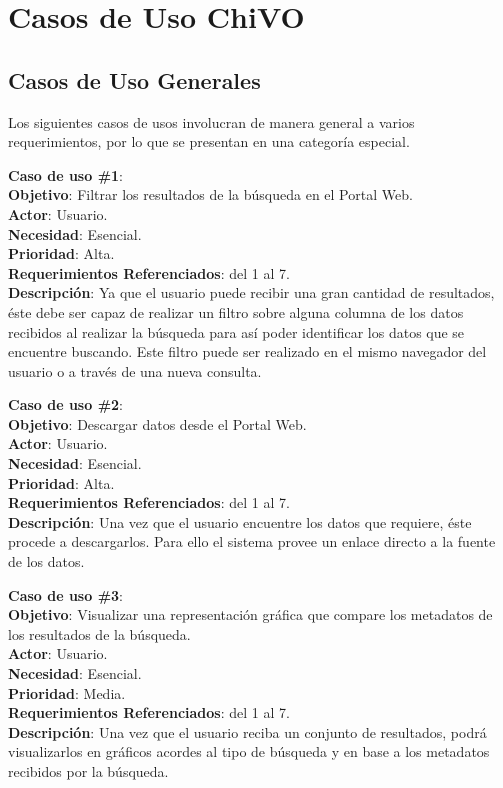 \section{Casos de Uso ChiVO}
\subsection{Casos de Uso Generales}
Los siguientes casos de usos involucran de manera general a varios
requerimientos, por lo que se presentan en una categoría especial. 

\noindent\textbf{Caso de uso \#1}: \\
\textbf{Objetivo}: Filtrar los resultados de la búsqueda en el Portal Web. \\
\textbf{Actor}: Usuario. \\
\textbf{Necesidad}: Esencial. \\
\textbf{Prioridad}: Alta. \\
\textbf{Requerimientos Referenciados}: del 1 al 7. \\
\textbf{Descripción}: Ya que el usuario puede recibir una gran cantidad de
resultados, éste debe ser capaz de realizar un filtro sobre alguna columna de
los datos recibidos al realizar la búsqueda para así poder identificar los
datos que se encuentre buscando. Este filtro puede ser realizado en el mismo
navegador del usuario o a través de una nueva consulta. 
\vspace{1.0cm}

\noindent\textbf{Caso de uso \#2}: \\
\textbf{Objetivo}: Descargar datos desde el Portal Web. \\
\textbf{Actor}: Usuario. \\
\textbf{Necesidad}: Esencial. \\
\textbf{Prioridad}: Alta. \\
\textbf{Requerimientos Referenciados}: del 1 al 7. \\
\textbf{Descripción}: Una vez que el usuario encuentre los datos que requiere, éste procede a descargarlos. Para ello el sistema provee un enlace directo a la fuente de los datos.
\vspace{1.0cm}

\noindent\textbf{Caso de uso \#3}: \\
\textbf{Objetivo}: Visualizar una representación gráfica que compare los metadatos de los resultados de la búsqueda. \\
\textbf{Actor}: Usuario. \\
\textbf{Necesidad}: Esencial. \\
\textbf{Prioridad}:  Media. \\
\textbf{Requerimientos Referenciados}: del 1 al 7. \\
\textbf{Descripción}: Una vez que el usuario reciba un conjunto de resultados, podrá visualizarlos en gráficos acordes al tipo de búsqueda y en base a los metadatos recibidos por la búsqueda.
\vspace{1.0cm}

